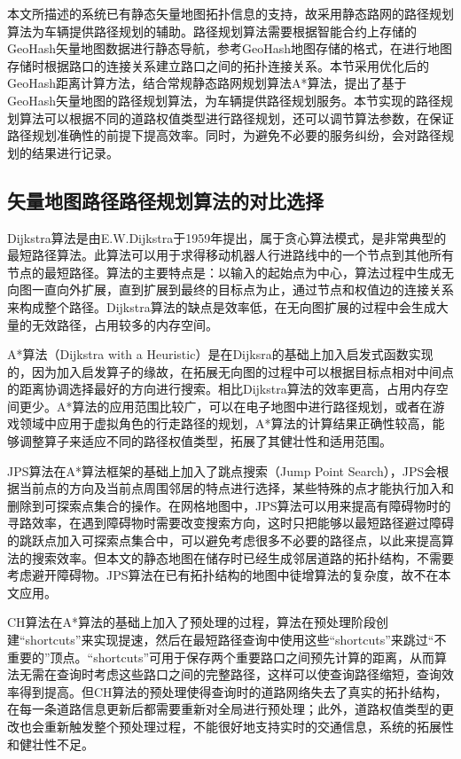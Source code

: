 本文所描述的系统已有静态矢量地图拓扑信息的支持，故采用静态路网的路径规划算法为车辆提供路径规划的辅助。路径规划算法需要根据智能合约上存储的GeoHash矢量地图数据进行静态导航，参考GeoHash地图存储的格式，在进行地图存储时根据路口的连接关系建立路口之间的拓扑连接关系。本节采用优化后的GeoHash距离计算方法，结合常规静态路网规划算法A*算法，提出了基于GeoHash矢量地图的路径规划算法，为车辆提供路径规划服务。本节实现的路径规划算法可以根据不同的道路权值类型进行路径规划，还可以调节算法参数，在保证路径规划准确性的前提下提高效率。同时，为避免不必要的服务纠纷，会对路径规划的结果进行记录。

\subsection{矢量地图路径路径规划算法的对比选择}

Dijkstra算法是由E.W.Dijkstra于1959年提出，属于贪心算法模式，是非常典型的最短路径算法。此算法可以用于求得移动机器人行进路线中的一个节点到其他所有节点的最短路径。算法的主要特点是：以输入的起始点为中心，算法过程中生成无向图一直向外扩展，直到扩展到最终的目标点为止，通过节点和权值边的连接关系来构成整个路径。Dijkstra算法的缺点是效率低，在无向图扩展的过程中会生成大量的无效路径，占用较多的内存空间。

A*算法（Dijkstra with a Heuristic）是在Dijksra的基础上加入启发式函数实现的，因为加入启发算子的缘故，在拓展无向图的过程中可以根据目标点相对中间点的距离协调选择最好的方向进行搜索。相比Dijkstra算法的效率更高，占用内存空间更少。A*算法的应用范围比较广，可以在电子地图中进行路径规划，或者在游戏领域中应用于虚拟角色的行走路径的规划，A*算法的计算结果正确性较高，能够调整算子来适应不同的路径权值类型，拓展了其健壮性和适用范围。

JPS算法在A*算法框架的基础上加入了跳点搜索（Jump Point Search），JPS会根据当前点的方向及当前点周围邻居的特点进行选择，某些特殊的点才能执行加入和删除到可探索点集合的操作。在网格地图中，JPS算法可以用来提高有障碍物时的寻路效率，在遇到障碍物时需要改变搜索方向，这时只把能够以最短路径避过障碍的跳跃点加入可探索点集合中，可以避免考虑很多不必要的路径点，以此来提高算法的搜索效率。但本文的静态地图在储存时已经生成邻居道路的拓扑结构，不需要考虑避开障碍物。JPS算法在已有拓扑结构的地图中徒增算法的复杂度，故不在本文应用。

CH算法在A*算法的基础上加入了预处理的过程，算法在预处理阶段创建“shortcuts”来实现提速，然后在最短路径查询中使用这些“shortcuts”来跳过“不重要的”顶点。“shortcuts”可用于保存两个重要路口之间预先计算的距离，从而算法无需在查询时考虑这些路口之间的完整路径，这样可以使查询路径缩短，查询效率得到提高。但CH算法的预处理使得查询时的道路网络失去了真实的拓扑结构，在每一条道路信息更新后都需要重新对全局进行预处理；此外，道路权值类型的更改也会重新触发整个预处理过程，不能很好地支持实时的交通信息，系统的拓展性和健壮性不足。

